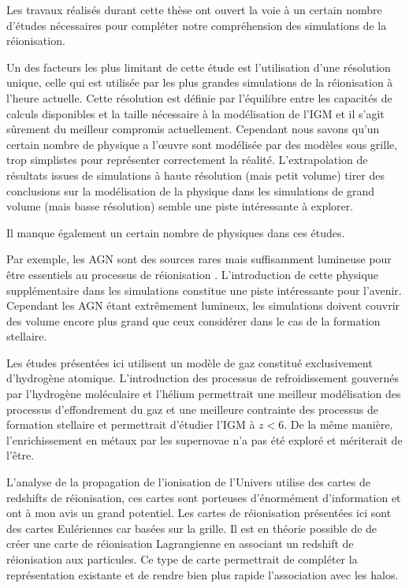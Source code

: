 Les travaux réalisés durant cette thèse ont ouvert la voie à un certain nombre d'études nécessaires pour compléter notre compréhension des simulations de la réionisation.

Un des facteurs les plus limitant de cette étude est l'utilisation d'une résolution unique, celle qui est utilisée par les plus grandes simulations de la réionisation à l'heure actuelle. 
Cette résolution est définie par l’équilibre entre les capacités de calculs disponibles et la taille nécessaire à la modélisation de l'\ac{IGM} et il s'agit sûrement du meilleur compromis actuellement.
Cependant nous savons qu'un certain nombre de physique a l’œuvre sont modélisée par des modèles sous grille, trop simplistes pour représenter correctement la réalité.
L'extrapolation de résultats issues de simulations à haute résolution (mais petit volume) tirer des conclusions sur la modélisation de la physique dans les simulations de grand volume (mais basse résolution) semble une piste intéressante à explorer.

Il manque également un certain nombre de physiques dans ces études.

Par exemple, les \ac{AGN} sont des sources rares mais suffisamment lumineuse pour être essentiels au processus de réionisation \citep{chardin_large-scale_2017}.
L'introduction de cette physique supplémentaire dans les simulations constitue une piste intéressante pour l'avenir.
Cependant les AGN étant extrêmement lumineux, les simulations doivent couvrir des volume encore plus grand que ceux considérer dans le cas de la formation stellaire.

Les études présentées ici utilisent un modèle de gaz constitué exclusivement d'hydrogène atomique.
L'introduction des processus de refroidissement gouvernés par l'hydrogène moléculaire et l'hélium permettrait une meilleur modélisation des processus d’effondrement du gaz et une meilleure contrainte des processus de formation stellaire et permettrait d'étudier l'\ac{IGM} à $z<6$.
De la même manière, l'enrichissement en métaux par les supernovae n'a pas été exploré et mériterait de l'être.

L'analyse de la propagation de l'ionisation de l'Univers utilise des cartes de redshifts de réionisation, ces cartes sont porteuses d'énormément d'information et ont à mon avis un grand potentiel.
Les cartes de réionisation présentées ici sont des cartes Eulériennes car basées sur la grille.
Il est en théorie possible de de créer une carte de réionisation Lagrangienne en associant un redshift de réionisation aux particules.
Ce type de carte permettrait de compléter la représentation existante et de rendre bien plus rapide l'association avec les halos.

